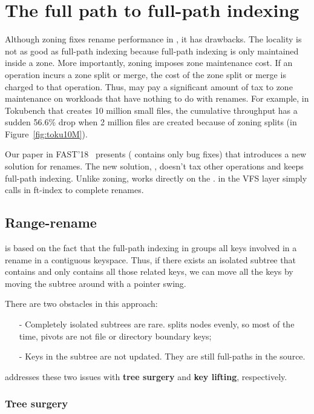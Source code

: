 \section{The full path to full-path indexing}
\label{sec:rename}

Although zoning fixes rename performance in \betrfs, it has drawbacks.
The locality is not as good as full-path indexing because full-path indexing is
only maintained inside a zone.
More importantly, zoning imposes zone maintenance cost.
If an operation incurs a zone split or merge, the cost of the zone split or
merge is charged to that operation.
Thus, \betrfs may pay a significant amount of tax to zone maintenance on
workloads that have nothing to do with renames.
For example, in Tokubench that creates 10 million small files, the cumulative
throughput has a sudden 56.6\% drop when 2 million files are created because
of zoning splits (\betrfsThree in Figure~\ref{fig:toku10M}).

Our paper in FAST'18~\cite{betrfs4} presents \betrfsFour (\betrfsThree
contains only bug fixes) that introduces a new solution for renames.
The new solution, \rr, doesn't tax other operations and keeps full-path
indexing.
Unlike zoning, \rr works directly on the \bet.
\betrfs in the VFS layer simply calls \rr in ft-index to complete renames.

\subsection{Range-rename}

\Rr is based on the fact that the full-path indexing in \betrfs groups all
keys involved in a rename in a contiguous keyspace.
Thus, if there exists an isolated subtree that contains and only contains all
those related keys, we can move all the keys by moving
the subtree around with a pointer swing.

There are two obstacles in this approach:
\begin{itemize}
\item[-] Completely isolated subtrees are rare. \bets splits nodes evenly, so
  most of the time, pivots are not file or directory boundary keys;
\item[-] Keys in the subtree are not updated. They are still full-paths in the
  source.
\end{itemize}

\Rr addresses these two issues with {\bf tree surgery} and {\bf key lifting},
respectively.

\subsubsection{Tree surgery}

